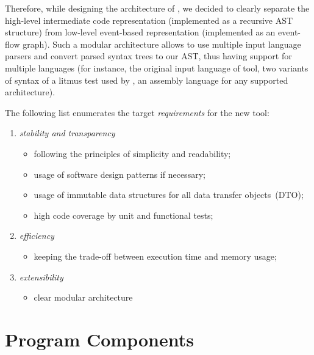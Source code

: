 Therefore, while designing the architecture of \porthos[2], we decided to clearly separate the high-level intermediate code representation (implemented as a recursive AST structure) from low-level event-based representation (implemented as an event-flow graph).
Such a modular architecture allows to use multiple input language parsers and convert parsed syntax trees to our AST, thus having support for multiple languages (for instance, the original input language of \porthos tool, two variants of syntax of a litmus test used by , an assembly language for any supported architecture).

The following list enumerates the target \textit{requirements} for the new tool:

\begin{enumerate}[nolistsep]
    \item \textit{stability and transparency}
        \begin{itemize}
            \item following the principles of simplicity and readability;
            \item usage of software design patterns if necessary;
            \item usage of immutable data structures for all data transfer objects~(DTO);
            \item high code coverage by unit and functional tests;
        \end{itemize}
    \item \textit{efficiency}
        \begin{itemize}[leftmargin=1em]
            \item keeping the trade-off between execution time and memory usage;
        \end{itemize}
    \item \textit{extensibility}
        \begin{itemize}[leftmargin=1em]
            \item clear modular architecture
        \end{itemize}
\end{enumerate}


\section{Program Components}
\label{ch:impl:comp}

